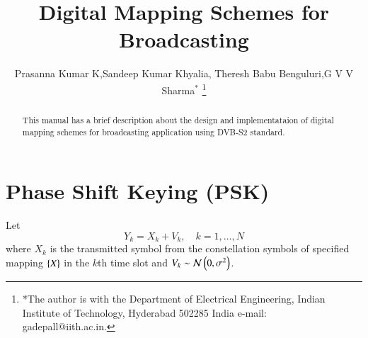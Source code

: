 \documentclass[journal,12pt,twocolumn]{IEEEtran}
\begin{document}


\let\StandardTheFigure\thefigure
\let\StandardTheTable\thetable





\def\putbox#1#2#3{\makebox[0in][l]{\makebox[#1][l]{}\raisebox{\baselineskip}[0in][0in]{\raisebox{#2}[0in][0in]{#3}}}}
     \def\rightbox#1{\makebox[0in][r]{#1}}
     \def\centbox#1{\makebox[0in]{#1}}
     \def\topbox#1{\raisebox{-\baselineskip}[0in][0in]{#1}}
     \def\midbox#1{\raisebox{-0.5\baselineskip}[0in][0in]{#1}}




\title{ 
Digital Mapping Schemes for Broadcasting
}



\author{Prasanna Kumar K,Sandeep Kumar Khyalia, Theresh Babu Benguluri,G V V Sharma$^{*}$%
\thanks{*The author is with the Department
of Electrical Engineering, Indian Institute of Technology, Hyderabad
502285 India e-mail:  gadepall@iith.ac.in.}
}


\maketitle

\tableofcontents

\bigskip
%
\begin{abstract}
\boldmath
This manual has a brief description about the design and implementataion of digital mapping schemes for broadcasting application using DVB-S2  \cite{dvb}  standard.
\end{abstract}


\section{Phase Shift Keying (PSK)}
Let 
\begin{equation}
Y_k= X_k + V_k, \quad k = 1,\dots,N
\end{equation} 
where $X_k$ is the transmitted symbol from the constellation symbols of specified mapping $\left\{X\right\}$ in the $k$th time slot and $V_k \sim \mathcal{N}\left(0,\sigma^2\right) $.
\end{document}
